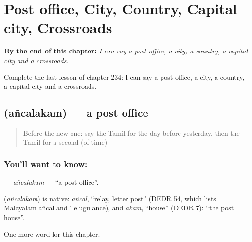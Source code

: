 
\chapter{Post office, City, Country, Capital city, Crossroads}
\label{ch:ta-post-office-city-country-capital-city-crossroads}

\begin{chapteropening}
\textbf{By the end of this chapter:} \emph{I can say a post office, a city, a country, a capital city and a crossroads.}

Complete the last lesson of chapter 234: I can say a post office, a city, a country, a capital city and a crossroads.
\end{chapteropening}

\section[\texorpdfstring{\ta{அஞ்சலகம்} (añcalakam)}{அஞ்சலகம் (añcalakam)}]{ (añcalakam) — a post office}

\label{lesson:TA-C234-ancalakam}



\begin{quote}
Before the new one: say the Tamil for the day before yesterday, then the Tamil for a second (of time).
\end{quote}

\subsection*{You'll want to know: }
\textbf{} — \emph{añcalakam} — \textquotedblleft{}a post office\textquotedblright{}.

\begin{cousinweb}
\textbf{} (\emph{añcalakam}) is native: \emph{añcal}, \textquotedblleft{}relay, letter post\textquotedblright{} (DEDR 54, which lists Malayalam añcal and Telugu ance), and \emph{akam}, \textquotedblleft{}house\textquotedblright{} (DEDR 7): \textquotedblleft{}the post house\textquotedblright{}.
\end{cousinweb}

\begin{grammarlens}[title={What you've built}]
One more word for this chapter.
\end{grammarlens}

